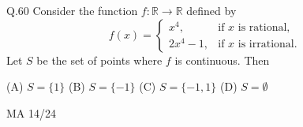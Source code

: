 \documentclass{article}
\begin{document}
																																																																																																								   Q.60 \quad Consider the function $f \colon \mathbb{R} \to \mathbb{R}$ defined by
																																																																																																								   \[
																																																																																																								   f(x) = 
																																																																																																								   \begin{cases}
																																																																																																								   x^4, & \text{if } x \text{ is rational}, \\
																																																																																																								   2x^4 - 1, & \text{if } x \text{ is irrational}.
																																																																																																								   \end{cases}
																																																																																																								   \]
																																																																																																								   Let $S$ be the set of points where $f$ is continuous. Then

																																																																																																								   (A) $S = \{1\}$ \hspace{2cm} (B) $S = \{-1\}$ \hspace{2cm} (C) $S = \{-1, 1\}$ \hspace{2cm} (D) $S = \emptyset$
																																																																																																								   \vspace{10em}
																																																																																																								   \begin{center}
																																																																																																								       {MA 14/24}
																																																																																																								       \end{center}
																																																																																																								       \newpage
\end{document}
